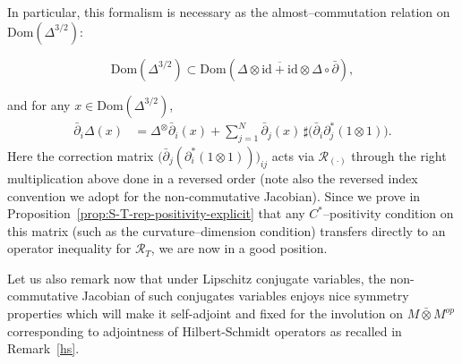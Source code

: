 \documentclass[10pt,a4paper,reqno]{amsart}
\newcommand{\Dom}{\mathrm{Dom}}
\begin{document}
\begin{flushleft}
In particular, this formalism is necessary as the almost--commutation relation on $\Dom(\Delta^{3/2})$:


\[
\Dom(\Delta^{3/2})\subset \Dom\!\left(\overline{\Delta \otimes\mathrm{id}+\mathrm{id}\otimes \Delta }\circ\bar{\partial}\right),
\]


and for any $x\in \Dom(\Delta^{3/2})$,
\begin{align*}
\bar{\partial}_{i}\Delta(x)
&= \Delta^{\otimes}\bar{\partial}_i(x)
+\sum_{j=1}^N\bar{\partial}_{j}(x)\,\sharp\big(\bar{\partial}_{i}\partial_{j}^{*}(1\otimes 1)\big).
\end{align*}
Here the correction matrix $\big(\bar\partial_j(\partial_{i}^{*}(1\otimes 1))\big)_{ij}$ acts via $\mathcal{R}_{(\cdot)}$ through the right multiplication above done in a reversed order (note also the reversed index convention we adopt for the non-commutative Jacobian). Since we prove in Proposition~\ref{prop:S-T-rep-positivity-explicit} that any $C^\ast$--positivity condition on this matrix (such as the curvature--dimension condition) transfers directly to an operator inequality for $\mathcal{R}_T$, we are now in a good position.
\end{flushleft}
\begin{flushleft}
    Let us also remark now that under Lipschitz conjugate variables, the non-commutative Jacobian of such conjugates variables enjoys nice symmetry properties which will make it self-adjoint and fixed for the involution on $M\bar\otimes M^{op}$ corresponding to adjointness of Hilbert-Schmidt operators as recalled in Remark~\ref{hs}.
\end{flushleft}
\end{document}
